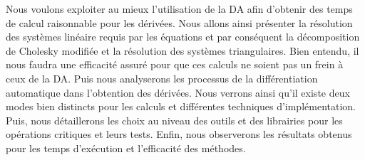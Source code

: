 {\co 
Nous voulons exploiter au mieux l'utilisation de la DA afin d'obtenir des temps de calcul raisonnable pour les d\'eriv\'ees. 
Nous allons ainsi pr\'esenter la r\'esolution des syst\`emes lin\'eaire requis par les \'equations et par cons\'equent 
la d\'ecomposition de Cholesky modifi\'ee et la r\'esolution des syst\`emes triangulaires. Bien entendu, il nous faudra
une efficacit\'e assur\'e pour que ces calculs ne soient pas un frein \`a ceux de la DA.
Puis nous analyserons les processus de la diff\'erentiation automatique dans 
l'obtention des d\'eriv\'ees. Nous verrons ainsi qu'il existe deux modes bien distincts pour les calculs et diff\'erentes techniques 
d'impl\'ementation. Puis, nous d\'etaillerons les choix au niveau des outils et des librairies pour les op\'erations critiques et leurs tests.
 Enfin, nous observerons les r\'esultats obtenus pour les temps d'ex\'ecution et l'efficacit\'e des m\'ethodes.}




